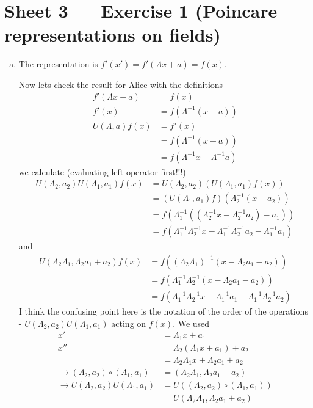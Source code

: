 \documentclass[10pt,a4paper]{report}
\theoremstyle{definition}
\begin{document}
\section{Sheet 3 — Exercise 1 (Poincare representations on fields)}
\begin{enumerate}[a)]
\item The representation is $f'(x')=f'(\Lambda x+a)=f(x)$. 

Now lets check the result for Alice with the definitions
\begin{align}
f'(\Lambda x+a)&=f(x)\\
f'(x)&=f(\Lambda^{-1}(x-a))\\
U(\Lambda,a)f(x)&=f'(x)\\
&=f(\Lambda^{-1}(x-a))\\
&=f(\Lambda^{-1}x-\Lambda^{-1}a)
\end{align}
we calculate (evaluating left operator first!!!)
\begin{align}
U(\Lambda_2,a_2)U(\Lambda_1,a_1)f(x)
&=U(\Lambda_2,a_2)(U(\Lambda_1,a_1)f(x))\\
&=(U(\Lambda_1,a_1)f)(\Lambda_2^{-1}(x-a_2))\\
&=f(\Lambda_1^{-1}((\Lambda_2^{-1}x-\Lambda_2^{-1}a_2)-a_1))\\
&=f(\Lambda_1^{-1}\Lambda_2^{-1}x-\Lambda_1^{-1}\Lambda_2^{-1}a_2-\Lambda_1^{-1}a_1)
\end{align}
and
\begin{align}
U(\Lambda_2\Lambda_1,\Lambda_2a_1+a_2)f(x)
&=f((\Lambda_2\Lambda_1)^{-1}(x-\Lambda_2a_1-a_2))\\
&=f(\Lambda_1^{-1}\Lambda_2^{-1}(x-\Lambda_2a_1-a_2))\\
&=f(\Lambda_1^{-1}\Lambda_2^{-1}x-\Lambda_1^{-1}a_1-\Lambda_1^{-1}\Lambda_2^{-1}a_2)
\end{align}
I think the confusing point here is the notation of the order of the operations - $U(\Lambda_2,a_2)U(\Lambda_1,a_1)$ acting on $f(x)$. We used
\begin{align}
x'&=\Lambda_1 x + a_1\\
x''&=\Lambda_2(\Lambda_1 x + a_1)+a_2\\
&=\Lambda_2\Lambda_1 x + \Lambda_2a_1+a_2\\
\rightarrow(\Lambda_2,a_2)\circ(\Lambda_1,a_1)&=(\Lambda_2\Lambda_1,\Lambda_2a_1+a_2)\\
\rightarrow U(\Lambda_2,a_2)U(\Lambda_1,a_1)
&=U((\Lambda_2,a_2)\circ(\Lambda_1,a_1))\\
&=U(\Lambda_2\Lambda_1,\Lambda_2a_1+a_2)
\end{align}



\end{enumerate}
\end{document}
